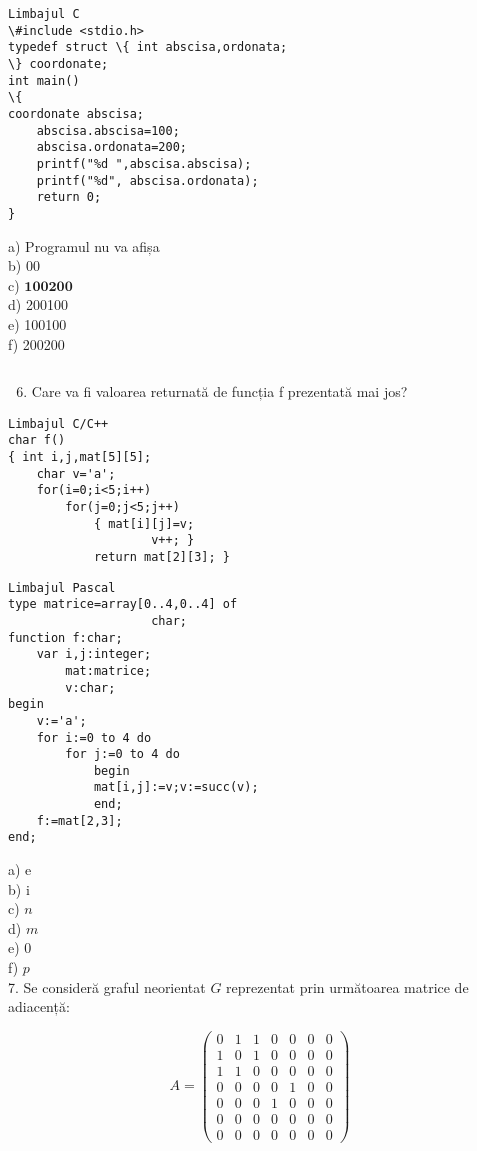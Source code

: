 \begin{verbatim}
Limbajul C
\#include <stdio.h>
typedef struct \{ int abscisa,ordonata;
\} coordonate;
int main()
\{
coordonate abscisa;
    abscisa.abscisa=100;
    abscisa.ordonata=200;
    printf("%d ",abscisa.abscisa);
    printf("%d", abscisa.ordonata);
    return 0;
}
\end{verbatim}

a) Programul nu va afișa\\
b) 00\\
c) $\mathbf{1 0 0} \mathbf{2 0 0}$\\
d) 200100\\
e) 100100\\
f) 200200

\begin{verbatim}

\end{verbatim}

\begin{enumerate}
  \setcounter{enumi}{5}
  \item Care va fi valoarea returnată de funcția f prezentată mai jos?
\end{enumerate}

\begin{verbatim}
Limbajul C/C++
char f()
{ int i,j,mat[5][5];
    char v='a';
    for(i=0;i<5;i++)
        for(j=0;j<5;j++)
            { mat[i][j]=v;
                    v++; }
            return mat[2][3]; }
\end{verbatim}

\begin{verbatim}
Limbajul Pascal
type matrice=array[0..4,0..4] of
                    char;
function f:char;
    var i,j:integer;
        mat:matrice;
        v:char;
begin
    v:='a';
    for i:=0 to 4 do
        for j:=0 to 4 do
            begin
            mat[i,j]:=v;v:=succ(v);
            end;
    f:=mat[2,3];
end;
\end{verbatim}

a) e\\
b) i\\
c) $n$\\
d) $m$\\
e) 0\\
f) $p$\\
7. Se consideră graful neorientat $G$ reprezentat prin următoarea matrice de adiacență:

$$
A=\left(\begin{array}{lllllll}
0 & 1 & 1 & 0 & 0 & 0 & 0 \\
1 & 0 & 1 & 0 & 0 & 0 & 0 \\
1 & 1 & 0 & 0 & 0 & 0 & 0 \\
0 & 0 & 0 & 0 & 1 & 0 & 0 \\
0 & 0 & 0 & 1 & 0 & 0 & 0 \\
0 & 0 & 0 & 0 & 0 & 0 & 0 \\
0 & 0 & 0 & 0 & 0 & 0 & 0
\end{array}\right)
$$

